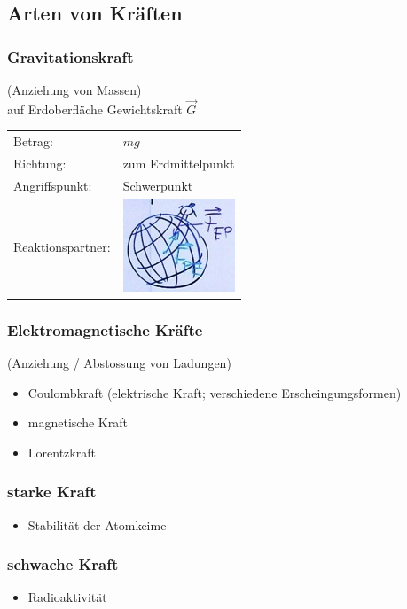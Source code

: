 \subsection{Arten von Kräften}
\subsubsection{Gravitationskraft}
(Anziehung von Massen) \\
auf Erdoberfläche Gewichtskraft $\vec{G}$ \\
\begin{tabular}{ll}
	Betrag:			&$mg$ \\
	Richtung:			&zum Erdmittelpunkt \\
	Angriffspunkt:	&Schwerpunkt \\
	Reaktionspartner:	&\includegraphics{Bild23}
\end{tabular}

\subsubsection{Elektromagnetische Kräfte}
(Anziehung / Abstossung von Ladungen)
\begin{itemize}[ label = $\rightarrow$ ]
	\item Coulombkraft (elektrische Kraft; verschiedene Erscheingungsformen)
	\item magnetische Kraft
	\item Lorentzkraft
\end{itemize}

\subsubsection{starke Kraft}
\begin{itemize}[ label = $\rightarrow$ ]
	\item Stabilität der Atomkeime
\end{itemize}

\subsubsection{schwache Kraft}
\begin{itemize}[ label = $\rightarrow$ ]
	\item Radioaktivität
\end{itemize}

